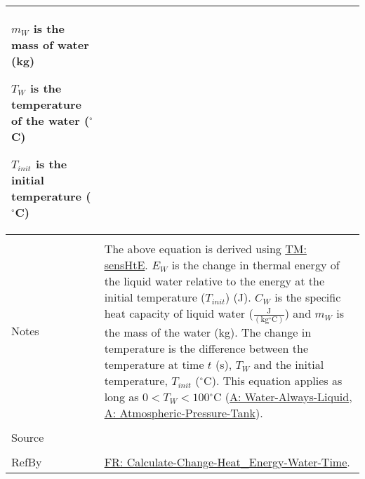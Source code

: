 \documentclass[12pt]{article}
\begin{document}
\begin{minipage}{\textwidth}
\begin{tabular}{p{} p{}}
\begin{symbDescription}
              \item{${m_{W}}$ is the mass of water (kg)}
              \item{${T_{W}}$ is the temperature of the water (${}^{\circ}$C)}
              \item{${T_{init}}$ is the initial temperature (${}^{\circ}$C)}
              \end{symbDescription}
\\ \midrule \\
Notes & The above equation is derived using \hyperref[TM:sensHtE]{TM: sensHtE}. ${E_{W}}$ is the change in thermal energy of the liquid water relative to the energy at the initial temperature (${T_{init}}$) (J). ${C_{W}}$ is the specific heat capacity of liquid water ($\frac{\text{J}}{(\text{kg}{}^{\circ}\text{C})}$) and ${m_{W}}$ is the mass of the water (kg). The change in temperature is the difference between the temperature at time $t$ (s), ${T_{W}}$ and the initial temperature, ${T_{init}}$ (${}^{\circ}$C). This equation applies as long as $0<{T_{W}}<100$${}^{\circ}$C (\hyperref[A:Water-Always-Liquid]{A: Water-Always-Liquid}, \hyperref[A:Atmospheric-Pressure-Tank]{A: Atmospheric-Pressure-Tank}).
\\ \midrule \\
Source & \cite{koothoor2013}
\\ \midrule \\
RefBy & \hyperref[reqCCHEWT]{FR: Calculate-Change-Heat\_Energy-Water-Time}.
\\ \bottomrule \end{tabular}
\end{minipage}\\
\end{document}
